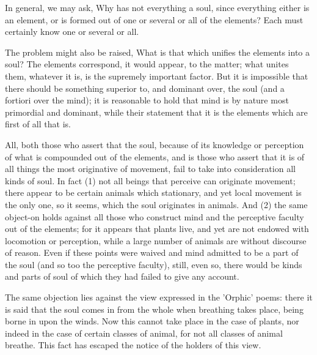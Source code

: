 In general, we may ask, Why has not everything a soul, since everything
either is an element, or is formed out of one or several or all of
the elements? Each must certainly know one or several or all.

The problem might also be raised, What is that which unifies the elements
into a soul? The elements correspond, it would appear, to the matter;
what unites them, whatever it is, is the supremely important factor.
But it is impossible that there should be something superior to, and
dominant over, the soul (and a fortiori over the mind); it is reasonable
to hold that mind is by nature most primordial and dominant, while
their statement that it is the elements which are first of all that
is. 

All, both those who assert that the soul, because of its knowledge
or perception of what is compounded out of the elements, and is those
who assert that it is of all things the most originative of movement,
fail to take into consideration all kinds of soul. In fact (1) not
all beings that perceive can originate movement; there appear to be
certain animals which stationary, and yet local movement is the only
one, so it seems, which the soul originates in animals. And (2) the
same object-on holds against all those who construct mind and the
perceptive faculty out of the elements; for it appears that plants
live, and yet are not endowed with locomotion or perception, while
a large number of animals are without discourse of reason. Even if
these points were waived and mind admitted to be a part of the soul
(and so too the perceptive faculty), still, even so, there would be
kinds and parts of soul of which they had failed to give any account.

The same objection lies against the view expressed in the 'Orphic'
poems: there it is said that the soul comes in from the whole when
breathing takes place, being borne in upon the winds. Now this cannot
take place in the case of plants, nor indeed in the case of certain
classes of animal, for not all classes of animal breathe. This fact
has escaped the notice of the holders of this view. 

